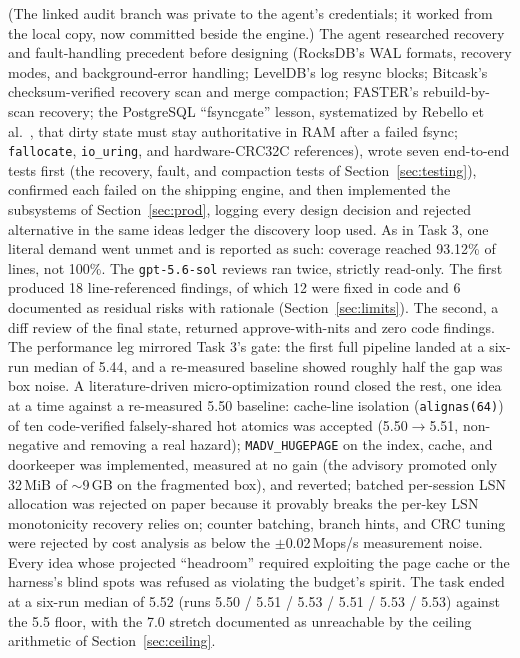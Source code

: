 \documentclass{article}
\newcommand{\HydraProd}{5.52}           %
\newcommand{\HydraProdRuns}{5.50 / 5.51 / 5.53 / 5.51 / 5.53 / 5.53}
\newcommand{\CovLinesProd}{93.12\%}
\begin{document}
(The linked audit branch was private to the agent's credentials; it worked from the local copy, now committed beside the engine.) The agent researched recovery and fault-handling precedent before designing (RocksDB's WAL formats, recovery modes, and background-error handling; LevelDB's log resync blocks; Bitcask's checksum-verified recovery scan and merge compaction; FASTER's rebuild-by-scan recovery; the PostgreSQL ``fsyncgate'' lesson, systematized by Rebello et al.~\cite{fsyncfail}, that dirty state must stay authoritative in RAM after a failed fsync; \texttt{fallocate}, \texttt{io\_uring}, and hardware-CRC32C references), wrote seven end-to-end tests first (the recovery, fault, and compaction tests of Section~\ref{sec:testing}), confirmed each failed on the shipping engine, and then implemented the subsystems of Section~\ref{sec:prod}, logging every design decision and rejected alternative in the same ideas ledger the discovery loop used. As in Task 3, one literal demand went unmet and is reported as such: coverage reached \CovLinesProd{} of lines, not 100\%. The \texttt{gpt-5.6-sol} reviews ran twice, strictly read-only. The first produced 18 line-referenced findings, of which 12 were fixed in code and 6 documented as residual risks with rationale (Section~\ref{sec:limits}). The second, a diff review of the final state, returned approve-with-nits and zero code findings. The performance leg mirrored Task 3's gate: the first full pipeline landed at a six-run median of 5.44, and a re-measured baseline showed roughly half the gap was box noise. A literature-driven micro-optimization round closed the rest, one idea at a time against a re-measured 5.50 baseline: cache-line isolation (\texttt{alignas(64)}) of ten code-verified falsely-shared hot atomics was accepted (5.50$\to$5.51, non-negative and removing a real hazard); \texttt{MADV\_HUGEPAGE} on the index, cache, and doorkeeper was implemented, measured at no gain (the advisory promoted only 32\,MiB of $\sim$9\,GB on the fragmented box), and reverted; batched per-session LSN allocation was rejected on paper because it provably breaks the per-key LSN monotonicity recovery relies on; counter batching, branch hints, and CRC tuning were rejected by cost analysis as below the $\pm$0.02\,Mops/s measurement noise. Every idea whose projected ``headroom'' required exploiting the page cache or the harness's blind spots was refused as violating the budget's spirit. The task ended at a six-run median of \HydraProd{} (runs \HydraProdRuns) against the 5.5 floor, with the 7.0 stretch documented as unreachable by the ceiling arithmetic of Section~\ref{sec:ceiling}.
\end{document}
